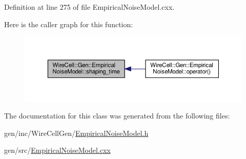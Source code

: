 Definition at line 275 of file Empirical\+Noise\+Model.\+cxx.

Here is the caller graph for this function\+:
\nopagebreak
\begin{figure}[H]
\begin{center}
\leavevmode
\includegraphics[width=350pt]{class_wire_cell_1_1_gen_1_1_empirical_noise_model_ada27f0991c188eb877a6702bb0878805_icgraph}
\end{center}
\end{figure}


The documentation for this class was generated from the following files\+:\begin{DoxyCompactItemize}
\item 
gen/inc/\+Wire\+Cell\+Gen/\hyperlink{_empirical_noise_model_8h}{Empirical\+Noise\+Model.\+h}\item 
gen/src/\hyperlink{_empirical_noise_model_8cxx}{Empirical\+Noise\+Model.\+cxx}\end{DoxyCompactItemize}
